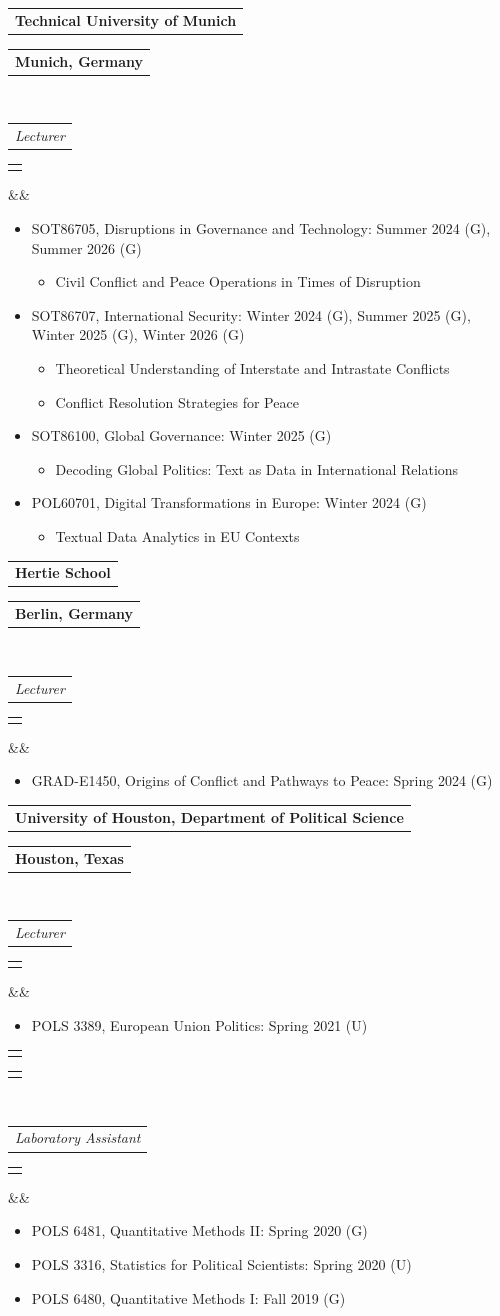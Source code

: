\documentclass[11pt,a4paper,roman]{moderncv}
\makeatletter
\newcommand*{\customcventry}[7][.25em]{%
  \begin{tabular}{@{}l}{\bfseries #4}\end{tabular}%
  \hfill%
  \begin{tabular}{l@{}}{\bfseries #5}\end{tabular}\\
  \begin{tabular}{@{}l}{\itshape #3}\end{tabular}%
  \hfill%
  \begin{tabular}{l@{}}{\itshape #2}\end{tabular}%
  \ifx&#7&%
  \else{\\%
    \begin{minipage}{\maincolumnwidth}\small#7\end{minipage}}\fi%
  \par\addvspace{#1}}
\makeatother
\begin{document}
\customcventry{}{Lecturer}{Technical University of Munich}{Munich, Germany}{}{}
\begin{itemize}
  \item SOT86705, Disruptions in Governance and Technology: Summer 2024 (G), Summer 2026 (G)
    \begin{itemize}
      \item Civil Conflict and Peace Operations in Times of Disruption
    \end{itemize}
  \item SOT86707, International Security: Winter 2024 (G), Summer 2025 (G), Winter 2025 (G), Winter 2026 (G)
    \begin{itemize}
      \item Theoretical Understanding of Interstate and Intrastate Conflicts
      \item Conflict Resolution Strategies for Peace
    \end{itemize}
  \item SOT86100, Global Governance: Winter 2025 (G)
    \begin{itemize}
      \item Decoding Global Politics: Text as Data in International Relations
    \end{itemize}
  \item POL60701, Digital Transformations in Europe: Winter 2024 (G)
    \begin{itemize}
      \item Textual Data Analytics in EU Contexts
    \end{itemize}
\end{itemize}
\vspace*{3mm}

\customcventry{}{Lecturer}{Hertie School}{Berlin, Germany}{}{}
\begin{itemize}
  \item GRAD-E1450, Origins of Conflict and Pathways to Peace: Spring 2024 (G)
\end{itemize}
\vspace*{3mm}

\customcventry{}{Lecturer}{University of Houston, Department of Political Science}{Houston, Texas}{}{}
\begin{itemize}
  \item POLS 3389, European Union Politics: Spring 2021 (U)
\end{itemize}
\vspace*{1mm}

\customcventry{}{Laboratory Assistant}{}{}{}{}
\begin{itemize}
  \item POLS 6481, Quantitative Methods II: Spring 2020 (G)
  \item POLS 3316, Statistics for Political Scientists: Spring 2020 (U)
  \item POLS 6480, Quantitative Methods I: Fall 2019 (G)
\end{itemize}
\vspace*{1mm}
\end{document}
